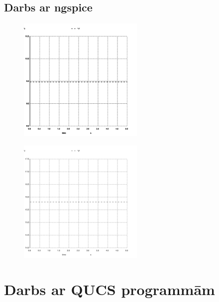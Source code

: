 \documentclass{report}
\begin{document}
\subsection{Darbs ar ngspice}
\begin{figure}[b!]
    \centering
        \begin{minipage}{.5\textwidth}
        \centering
        \includegraphics[width=6cm]{011.png}
        \label{att:ngspice1}
        \end{minipage}%
        
        \begin{minipage}{.5\textwidth}
        \centering
        \includegraphics[width=6cm]{012.png}
        \label{att:ngspice2}
        \end{minipage}
\end{figure}

\newpage

\section{Darbs ar QUCS programmām}
\end{document}
